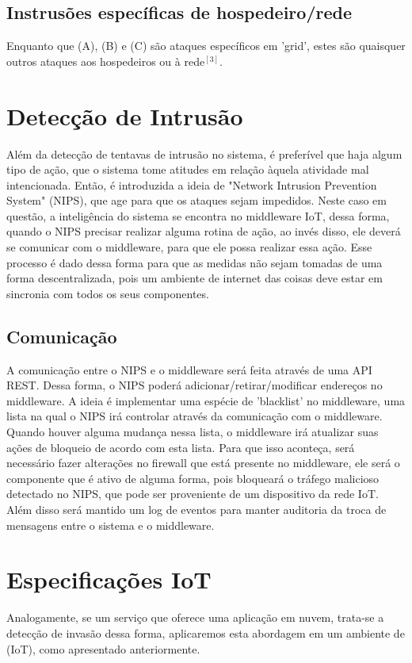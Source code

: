 \documentclass[journal]{IEEEtran}
\begin{document}
\subsection{Instrusões específicas de hospedeiro/rede}
Enquanto que (A), (B) e (C) são ataques específicos em 'grid', estes são quaisquer outros ataques aos hospedeiros ou à rede$^{ [3] }$.

\section{Detecção de Intrusão}
Além da detecção de tentavas de intrusão no sistema, é preferível que haja algum tipo de ação, que o sistema tome atitudes em relação àquela atividade mal intencionada. Então, é introduzida a ideia de "Network Intrusion Prevention System" (NIPS), que age para que os ataques sejam impedidos. Neste caso em questão, a inteligência do sistema se encontra no middleware IoT, dessa forma, quando o NIPS precisar realizar alguma rotina de ação, ao invés disso, ele deverá se comunicar com o middleware, para que ele possa realizar essa ação. Esse processo é dado dessa forma para que as medidas não sejam tomadas de uma forma descentralizada, pois um ambiente de internet das coisas deve estar em sincronia com todos os seus componentes. \par
\subsection{Comunicação}
A comunicação entre o NIPS e o middleware será feita através de uma API REST. Dessa forma, o NIPS poderá adicionar/retirar/modificar endereços no middleware. A ideia é implementar uma espécie de 'blacklist' no middleware, uma lista na qual o NIPS irá controlar através da comunicação com o middleware. Quando houver alguma mudança nessa lista, o middleware irá atualizar suas ações de bloqueio de acordo com esta lista. Para que isso aconteça, será necessário fazer alterações no firewall que está presente no middleware, ele será o componente que é ativo de alguma forma, pois bloqueará o tráfego malicioso detectado no NIPS, que pode ser proveniente de um dispositivo da rede IoT. Além disso será mantido um log de eventos para manter auditoria da troca de mensagens entre o sistema e o middleware. \par


\section{Especificações IoT}
Analogamente, se um serviço que oferece uma aplicação em nuvem, trata-se a detecção de invasão dessa forma, aplicaremos esta abordagem em um ambiente de (IoT), como apresentado anteriormente. \par
\end{document}
